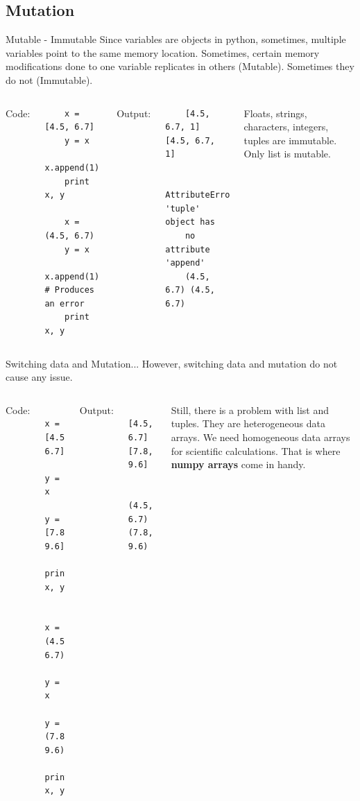\documentclass[10pt]{beamer}
\begin{document}
\subsection{Mutation}
\begin{frame}[fragile]{Mutable - Immutable}
Since variables are objects in python, sometimes, multiple variables point to the same memory location. Sometimes, certain memory modifications done to one variable replicates in others (Mutable). Sometimes they do not (Immutable).

\begin{columns}[t]
	Code:
\begin{lstlisting}
	x = [4.5, 6.7]
	y = x
	x.append(1)
	print x, y
	
	x = (4.5, 6.7)
	y = x
	x.append(1) # Produces an error
	print x, y
\end{lstlisting} 
	Output:
\begin{lstlisting}
	[4.5, 6.7, 1] [4.5, 6.7, 1]
	
	AttributeError: 'tuple' object has 
	no attribute 'append'
	(4.5, 6.7) (4.5, 6.7)
\end{lstlisting}
Floats, strings, characters, integers, tuples are immutable. Only list is mutable.
\end{columns}

\end{frame}

\begin{frame}[fragile]{Switching data and Mutation...}
However, switching data and mutation do not cause any issue.

\begin{columns}[t]
	Code:
\begin{lstlisting}
	x = [4.5, 6.7]
	y = x
	y = [7.8, 9.6]
	print x, y
	
	x = (4.5, 6.7)
	y = x
	y = (7.8, 9.6)
	print x, y
\end{lstlisting} 
	Output:
\begin{lstlisting}
	[4.5, 6.7] [7.8, 9.6]
	
	(4.5, 6.7) (7.8, 9.6)
\end{lstlisting}

Still, there is a problem with list and tuples. They are heterogeneous data arrays. We need homogeneous data arrays for scientific calculations. That is where \textbf{numpy arrays} come in handy.

\end{columns}

\end{frame}
\end{document}
